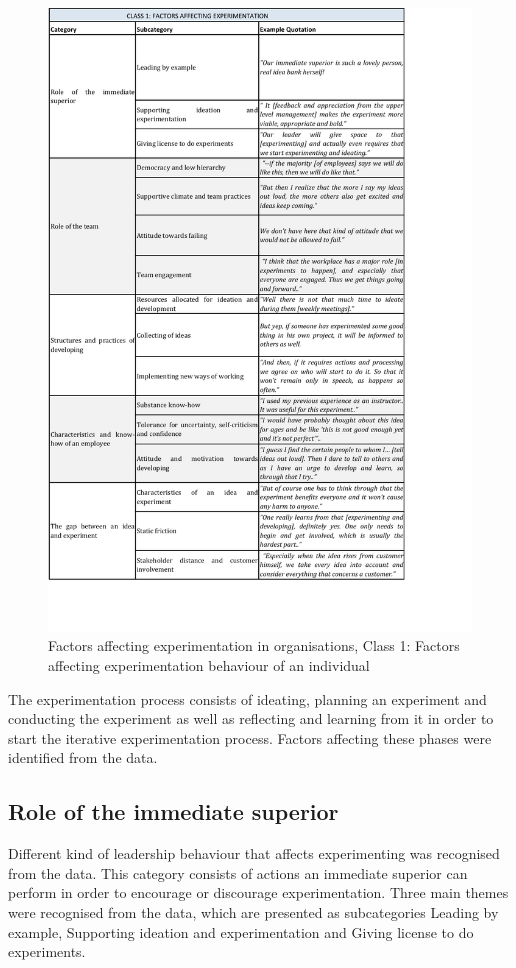 \begin{figure}[!H]
\vspace{-20pt}
\hspace{-25pt}
\includegraphics{class1.pdf}
\vspace{-80pt}
\caption{Factors affecting experimentation in organisations, Class 1: Factors affecting experimentation behaviour of an individual}
\label{tbl:class1}
\end{figure}

The experimentation process consists of ideating, planning an experiment and conducting the experiment as well as reflecting and learning from it in order to start the iterative experimentation process. Factors affecting these phases were identified from the data. 

\subsection{Role of the immediate superior}
Different kind of leadership behaviour that affects experimenting was recognised from the data. This category consists of actions an immediate superior can perform in order to encourage or discourage experimentation. Three main themes were recognised from the data, which are presented as subcategories Leading by example, Supporting ideation and experimentation and Giving license to do experiments.

